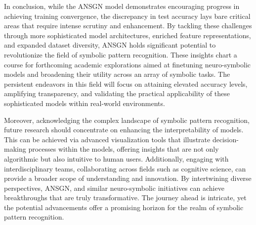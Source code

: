 \documentclass{article}
\begin{document}
In conclusion, while the ANSGN model demonstrates encouraging progress in achieving training convergence, the discrepancy in test accuracy lays bare critical areas that require intense scrutiny and enhancement. By tackling these challenges through more sophisticated model architectures, enriched feature representations, and expanded dataset diversity, ANSGN holds significant potential to revolutionize the field of symbolic pattern recognition. These insights chart a course for forthcoming academic explorations aimed at finetuning neuro-symbolic models and broadening their utility across an array of symbolic tasks. The persistent endeavors in this field will focus on attaining elevated accuracy levels, amplifying transparency, and validating the practical applicability of these sophisticated models within real-world environments. 

Moreover, acknowledging the complex landscape of symbolic pattern recognition, future research should concentrate on enhancing the interpretability of models. This can be achieved via advanced visualization tools that illustrate decision-making processes within the models, offering insights that are not only algorithmic but also intuitive to human users. Additionally, engaging with interdisciplinary teams, collaborating across fields such as cognitive science, can provide a broader scope of understanding and innovation. By intertwining diverse perspectives, ANSGN, and similar neuro-symbolic initiatives can achieve breakthroughs that are truly transformative. The journey ahead is intricate, yet the potential advancements offer a promising horizon for the realm of symbolic pattern recognition.


\end{document}
